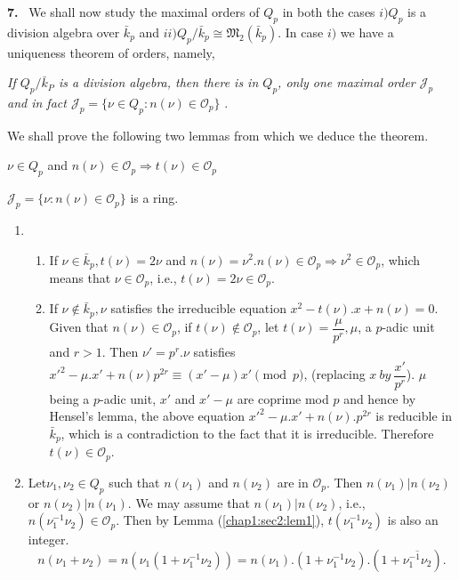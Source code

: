 \textbf{7.}~ We shall now study the maximal orders of $Q_p$ in both the cases
$i) Q_p$ is a division algebra over $\bar{k}_p$ and $ii) Q_p/\bar{k}_p
\cong \mathfrak{M}_2 (\bar{k}_p)$. In case $i)$ we have a uniqueness
theorem of orders, namely, 
\begin{theorem}\label{chap1:sec2:thm4}%
  {\em If $Q_p/\bar{k}_P$ is a division algebra, then there is in
    $Q_p$, only one maximal order $\mathcal{J}_p$ and in fact
    $\mathcal{J}_p = \{\nu \in Q_p : n(\nu) \in \mathscr{O}_p\}$ }. 
\end{theorem} 
 
We shall prove the following two lemmas from which we deduce the theorem.
\begin{lemma}\label{chap1:sec2:lem1}
$\nu \in Q_p$ and $n(\nu) \in \mathscr{O}_p \Rightarrow t(\nu)
    \in \mathscr{O}_p$ 
\end{lemma}
\begin{lemma}\label{chap1:sec2:lem2}
   $\mathcal{J}_p = \{ \nu : n(\nu) \in \mathscr{O}_p\}$ is a ring.
\end{lemma}

  \begin{enumerate}[\rm 1)]
  \item
    \begin{enumerate}[\rm a)]
    \item If $\nu \in \bar{k}_p, t (\nu) = 2 \nu$ and $n(\nu) =
      \nu^2. n (\nu) \in \mathscr{O}_p \Rightarrow \nu^2 \in
      \mathscr{O}_p$, which means that $\nu \in \mathscr{O}_p$, i.e.,
      $t(\nu) = 2 \nu \in \mathscr{O}_p$. 
    \item If $\nu \notin \bar{k}_p, \nu$ satisfies the irreducible
      equation $x^2 - t (\nu). x + n(\nu) = 0$. Given that $n(\nu) \in
      \mathscr{O}_p$, if $t(\nu) \notin \mathscr{O}_p$, let $t(\nu) =
      \dfrac{\mu}{p^r}, \mu$, a $p$-adic unit and $r > 1$. Then $\nu'
      = p^r.  \nu$ satisfies $x'^2 - \mu.  x' + n(\nu)p^{2r} \equiv
      (x' - \mu) x' \pmod p$, (replacing $x ~ by ~
      \dfrac{x'}{p^r}$). $\mu$ being a $p$-adic unit, $x'$ and $x' -
      \mu$ are coprime mod $p$ and hence by Hensel's lemma, the above
      equation $x'^2 - \mu.  x' + n(\nu).  p^{2r}$ is reducible in
      $\bar{k}_p$, which is a contradiction to the fact that it is
      irreducible. Therefore $t(\nu) \in \mathscr{O}_p$. 
    \end{enumerate}
  \item  Let\pageoriginale $\nu_1,  \nu_2 \in Q_p$ such that $n(\nu_1)$ and
    $n(\nu_2)$ are in $\mathscr{O}_p$. Then $n(\nu_1) | n(\nu_2)$ or
    $n(\nu_2)|n(\nu_1)$. We may assume that $n(\nu_1) | n(\nu_2)$,
    i.e., $n(\nu^{-1}_1 \nu_2) \in \mathscr{O}_p$. Then by
    Lemma (\ref{chap1:sec2:lem1}),
    $t(\nu^{-1}_{1} \nu_2)$ is also an integer. 
    $$
    n(\nu_1 + \nu_2) = n(\nu_1(1 + \nu^{-1}_1 \nu_2)) = n(\nu_1). (1 +
    \nu^{-1}_1 \nu_2). (1 + \overline{\nu^{-1}_1 \nu_2}).
    $$ 
  \end{enumerate}

